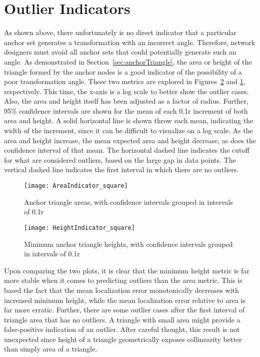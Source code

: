 \section{Outlier Indicators} 
\label{sec:outlierindicators}
As shown above, there unfortunately is no direct indicator that a particular anchor set generates a transformation with an incorrect angle.  Therefore, network designers must avoid all anchor sets that could potentially generate such an angle.  As demonstrated in Section~\ref{sec:anchorTriangle}, the area or height of the triangle formed by the anchor nodes is a good indicator of the possibility of a poor transformation angle.  These two metrics are explored in Figures~\ref{fig:heightIndicator} and \ref{fig:areaIndicator}, respectively.  This time, the x-axis is a log scale to better show the outlier cases. Also, the area and height itself has been adjusted as a factor of radius. Further, 95\% confidence intervals are shown for the mean of each 0.1r increment of both area and height.  A solid horizontal line is shown throw each mean, indicating the width of the increment, since it can be difficult to visualize on a log scale.  As the area and height increase, the mean expected area and height decrease, as does the confidence interval of that mean.  The horizontal dashed line indicates the cutoff for what are considered outliers, based on the large gap in data points.  The vertical dashed line indicates the first interval in which there are no outliers.  

\begin{figure}
  \centering
	\texttt{[image: AreaIndicator\_square]}
	\caption[Anchor triangle areas]{Anchor triangle areas, with confidence intervals grouped in intervals of 0.1r}	
	\label{fig:areaIndicator}
\end{figure}

\begin{figure}
  \centering
	\texttt{[image: HeightIndicator\_square]}
	\caption[Minimum anchor triangle heights]{Minimum anchor triangle heights, with confidence intervals grouped in intervals of 0.1r}	
	\label{fig:heightIndicator}
\end{figure}

Upon comparing the two plots, it is clear that the minimum height metric is far more stable when it comes to predicting outliers than the area metric.  This is based the fact that the mean localization error monotonically decreases with increased minimum height, while the mean localization error relative to area is far more erratic.  Further, there are some outlier cases after the first interval of triangle area that has no outliers.  A triangle with small area might provide a false-positive indication of an outlier.  After careful thought, this result is not unexpected since height of a triangle geometrically exposes collinearity better than simply area of a triangle.

